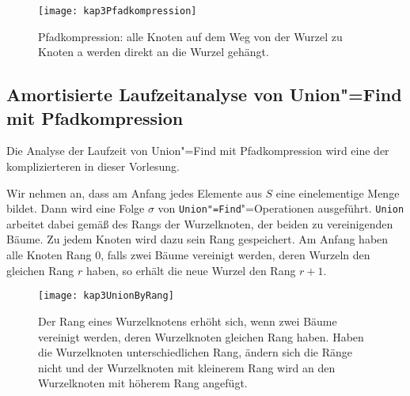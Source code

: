 \begin{figure}[htb]
  \centering
  \texttt{[image: kap3Pfadkompression]}
  \caption{Pfadkompression: alle Knoten auf dem Weg von der Wurzel zu Knoten a werden direkt an die Wurzel gehängt.}
  \label{kap3Pfadkompression}
\end{figure}

%



\subsection{Amortisierte Laufzeitanalyse von Union"=Find mit Pfadkompression}
Die Analyse der Laufzeit von Union"=Find mit Pfadkompression wird eine der komplizierteren in dieser Vorlesung.

Wir nehmen an, dass am Anfang jedes Elemente aus $S$ eine einelementige Menge bildet. Dann wird eine Folge $\sigma$ von \texttt{Union"=Find}"=Operationen ausgeführt. \texttt{Union} arbeitet dabei gemäß des Rangs der Wurzelknoten, der beiden zu vereinigenden Bäume. Zu jedem Knoten wird dazu sein Rang gespeichert. Am Anfang haben alle Knoten Rang $0$, falls zwei Bäume vereinigt werden, deren Wurzeln den gleichen Rang $r$ haben, so erhält die neue Wurzel den Rang $r+1$.

\begin{figure}[htb]
  \centering
  \texttt{[image: kap3UnionByRang]}
  \caption{Der Rang eines Wurzelknotens erhöht sich, wenn zwei Bäume vereinigt werden, deren Wurzelknoten gleichen Rang haben. Haben die Wurzelknoten unterschiedlichen Rang, ändern sich die Ränge nicht und der Wurzelknoten mit kleinerem Rang wird an den Wurzelknoten mit höherem Rang angefügt.}
  \label{kap3UnionByRang}
\end{figure}

